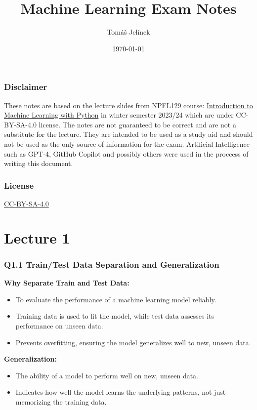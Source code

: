 \documentclass[11pt]{article}
\title{Machine Learning Exam Notes}
\author{Tomáš Jelínek}
\date{\today}
\begin{document}
\maketitle

\tableofcontents

\newpage

\section{Disclaimer}
These notes are based on the lecture slides from NPFL129 course: \href{https://ufal.mff.cuni.cz/courses/npfl129/2324-winter#home}{Introduction to Machine Learning with Python} in winter semester 2023/24 which are under CC-BY-SA-4.0 license. The notes are not guaranteed to be correct and are not a substitute for the lecture. They are intended to be used as a study aid and should not be used as the only source of information for the exam.
Artificial Intelligence such as GPT-4, GitHub Copilot and possibly others were used in the proccess of writing this document.

\section{License}
\href{https://creativecommons.org/licenses/by-sa/4.0/}{CC-BY-SA-4.0}

\part{Lecture 1}
\section{Q1.1 Train/Test Data Separation and Generalization}

\textbf{Why Separate Train and Test Data:}
\begin{itemize}
    \item To evaluate the performance of a machine learning model reliably.
    \item Training data is used to fit the model, while test data assesses its performance on unseen data.
    \item Prevents overfitting, ensuring the model generalizes well to new, unseen data.
\end{itemize}

\textbf{Generalization:}
\begin{itemize}
    \item The ability of a model to perform well on new, unseen data.
    \item Indicates how well the model learns the underlying patterns, not just memorizing the training data.
\end{itemize}
\end{document}
